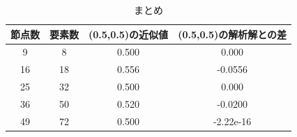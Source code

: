 \documentclass[a4paper,11pt]{jsarticle}
\begin{document}
\begin{table}
  \begin{center}
    \label{sammry}
    \caption{まとめ}
    \begin{tabular}{cccc} \hline
      節点数 & 要素数 & (0.5,0.5)の近似値 & (0.5,0.5)の解析解との差 \\ \hline
      9 & 8 & 0.500 & 0.000 \\
      16 & 18 & 0.556 & -0.0556 \\
      25 & 32 & 0.500 & 0.000 \\
      36 & 50 & 0.520 & -0.0200 \\
      49 & 72 & 0.500 & -2.22e-16 \\ \hline
    \end{tabular}
  \end{center}
\end{table}
\end{document}
